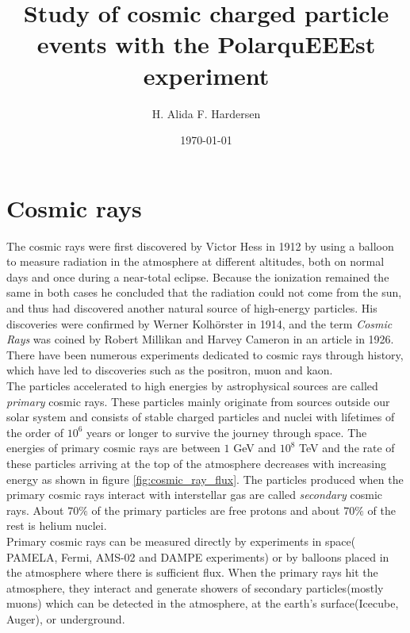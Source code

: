 \documentclass[prX, twocolumn, a4paper]{revtex4}
\begin{document}
\title{Study of cosmic charged particle events with the PolarquEEEst experiment}
\author{H. Alida F. Hardersen}
\date{\today}

\begin{abstract}
    \centering
\end{abstract}
\maketitle

\section{Cosmic rays}

The cosmic rays were first discovered by Victor Hess in 1912 by using a balloon to measure radiation in the atmosphere at different altitudes, both on normal days and once during a near-total eclipse. Because the ionization remained the same in both cases he concluded that the radiation could not come from the sun, and thus had discovered another natural source of high-energy particles. His discoveries were confirmed by Werner Kolhörster in 1914, and the term \textit{Cosmic Rays} was coined by Robert Millikan and Harvey Cameron in an article in 1926. There have been numerous experiments dedicated to cosmic rays through history, which have led to discoveries such as the positron, muon and kaon. \\ 

The particles accelerated to high energies by astrophysical sources are called \textit{primary} cosmic rays. These particles mainly originate from sources outside our solar system and consists of stable charged particles and nuclei with lifetimes of the order of $10^6$ years or longer to survive the journey through space. The energies of primary cosmic rays are between $1$ GeV and $10^8$ TeV and the rate of these particles arriving at the top of the atmosphere decreases with increasing energy as shown in figure \ref{fig:cosmic_ray_flux}. The particles produced when the primary cosmic rays interact with interstellar gas are called \textit{secondary} cosmic rays. About $70\%$ of the primary particles are free protons and about $70\%$ of the rest is helium nuclei\cite{PhysRevD.98.030001}.\\

Primary cosmic rays can be measured directly by experiments in space( PAMELA, Fermi, AMS-02 and DAMPE experiments) or by balloons placed in the atmosphere where there is sufficient flux. When the primary rays hit the atmosphere, they interact and generate showers of secondary particles(mostly muons) which can be detected in the atmosphere, at the earth's surface(Icecube, Auger), or underground. 
\end{document}
